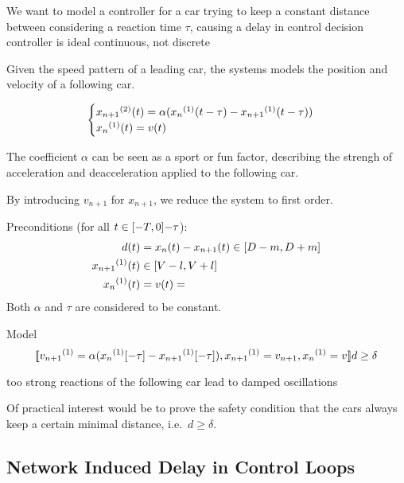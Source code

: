         We want to model a controller for a car
        trying to keep a constant distance between
        considering a reaction time $\tau$, causing a delay in control decision
        controller is ideal continuous, not discrete

        Given the speed pattern of a leading car, the systems models the position and velocity of a following car.

        \begin{equation*}
            \begin{cases}
                \D[2]{x_{n+1}}(t) = \alpha (\D{x_n}(t-\tau)-\D{x_{n+1}}(t-\tau))\\
                \D{x_n}(t) = v(t)
            \end{cases}
        \end{equation*}

        The coefficient $\alpha$ can be seen as a sport or fun factor, describing the strengh of acceleration and deacceleration applied to the following car.

        By introducing $v_{n+1}$ for $x_{n+1}$, we reduce the system to first order.

        Preconditions (for all $t\in[-T,0]{-\tau}$):
        \begin{align*}
            d(t) &= x_n(t)-x_{n+1}(t) \in\compactum{D-m}{D+m}\\
            \D{x_{n+1}}(t) &\in\compactum{V-l}{V+l}\\
            \D{x_n}(t) &= v(t) = 
        \end{align*}
        Both $\alpha$ and $\tau$ are considered to be constant.

        Model
        \begin{equation*}
            \dbox{\hevolve{
                \D{v_{n+1}} = \alpha(\D{x_n}[-\tau]-\D{x_{n+1}}[-\tau])\syssep
                \D{x_{n+1}} = v_{n+1}\syssep
                \D{x_n} = v
            }}{d\geq\delta}
        \end{equation*}

        too strong reactions of the following car lead to damped oscillations

        Of practical interest would be to prove the safety condition that the cars always keep a certain minimal distance, i.e.\ $d\geq\delta$.

    \subsection{Network Induced Delay in Control Loops}

